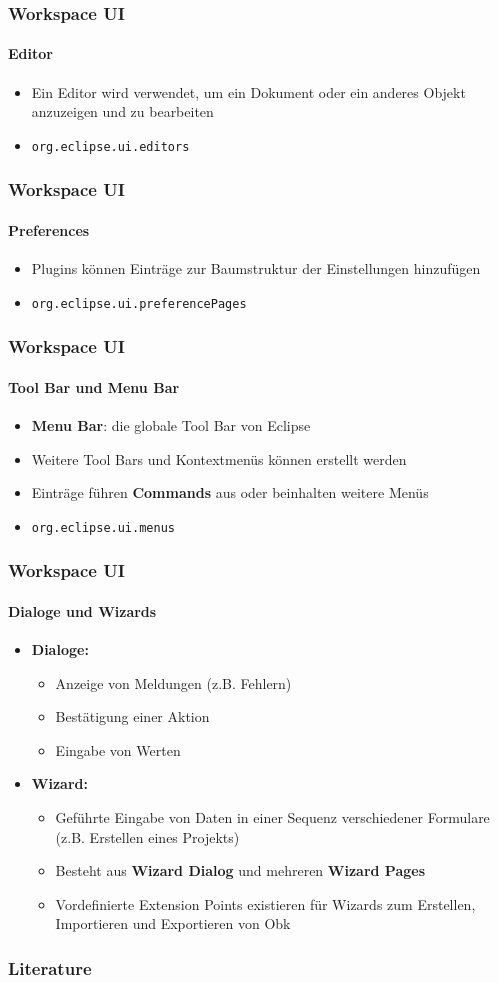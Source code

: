 {\begin{frame}
  \frametitle{Workspace UI}
  \framesubtitle{Editor}
  \begin{itemize}
    \item Ein Editor wird verwendet, um ein Dokument oder ein anderes Objekt anzuzeigen und zu bearbeiten
    \item \texttt{org.eclipse.ui.editors}
  \end{itemize}
\end{frame}

\begin{frame}
  \frametitle{Workspace UI}
  \framesubtitle{Preferences}
  \begin{itemize}
    \item Plugins können Einträge zur Baumstruktur der Einstellungen hinzufügen
    \item \texttt{org.eclipse.ui.preferencePages}
  \end{itemize}
\end{frame}

\begin{frame}
  \frametitle{Workspace UI}
  \framesubtitle{Tool Bar und Menu Bar}
  \begin{itemize}
    \item \textbf{Menu Bar}: die globale Tool Bar von Eclipse
    \item Weitere Tool Bars und Kontextmenüs können erstellt werden
    \item Einträge führen \textbf{Commands} aus oder beinhalten weitere Menüs
    \item \texttt{org.eclipse.ui.menus}
  \end{itemize}
\end{frame}

\begin{frame}
  \frametitle{Workspace UI}
  \framesubtitle{Dialoge und Wizards}
  \begin{itemize}
    \item \textbf{Dialoge:}
    \begin{itemize}
      \item Anzeige von Meldungen (z.B. Fehlern)
      \item Bestätigung einer Aktion
      \item Eingabe von Werten
    \end{itemize}
    \item \textbf{Wizard:}
    \begin{itemize}
      \item Geführte Eingabe von Daten in einer Sequenz verschiedener Formulare (z.B. Erstellen eines Projekts)
      \item Besteht aus \textbf{Wizard Dialog} und mehreren \textbf{Wizard Pages}
      \item Vordefinierte Extension Points existieren für Wizards zum Erstellen, Importieren und Exportieren von Obk
    \end{itemize}
  \end{itemize}
\end{frame}



\begin{frame}
\frametitle{Literature}


\end{frame}


}